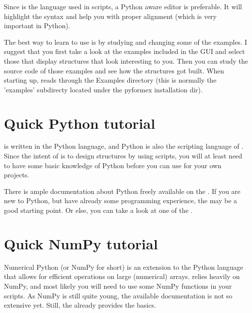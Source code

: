 Since  is the language used in \pyformex scripts, a Python aware editor is preferable. It will highlight the syntax and help you with proper alignment (which is very important in Python). 
 

The best way to learn to use \pyformex is by studying and changing some of the examples. I suggest that you first take a look at the examples included in the \pyformex GUI and select those that display structures that look interesting to you. Then you can study the source code of those examples and see how the structures got built. 
When starting up, \pyformex reads through the Examples directory (this is normally the 'examples' subdirecty located under the pyformex installation dir).  


\section{Quick {Python tutorial}}
\label{sec:python-tutorial}
\pyf is written in the Python language, and Python is also the scripting language of \pyf. Since the intent of \pyf is to design structures by using scripts, you will at least need to have some basic knowledge of Python before you can use \pyf for your own projects.

There is ample documentation about Python freely available on the . 
If you are new to Python, but have already some programming experience, the  may be a good starting point.
Or else, you can take a look at one of the .


\section{Quick NumPy tutorial}
\label{sec:numpy-tutorial}
Numerical Python (or NumPy for short) is an extension to the Python language that allows for efficient operations on large (numerical) arrays. \pyf relies heavily on NumPy, and most likely you will need to use some NumPy functions in your scripts. As NumPy is still quite young, the available documentation is not so extensive yet. Still, the  already provides the basics.


